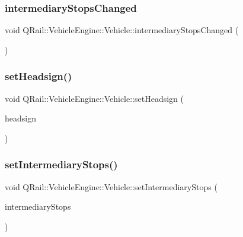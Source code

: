 \subsubsection{\texorpdfstring{intermediaryStopsChanged}{intermediaryStopsChanged}}
{\footnotesize\ttfamily void Q\+Rail\+::\+Vehicle\+Engine\+::\+Vehicle\+::intermediary\+Stops\+Changed (\begin{DoxyParamCaption}{ }\end{DoxyParamCaption})\hspace{0.3cm}{\ttfamily [signal]}}

\mbox{\label{classQRail_1_1VehicleEngine_1_1Vehicle_a699a7d8cd3a6a665554cff78d7ce1472}} 
\subsubsection{\texorpdfstring{setHeadsign()}{setHeadsign()}}
{\footnotesize\ttfamily void Q\+Rail\+::\+Vehicle\+Engine\+::\+Vehicle\+::set\+Headsign (\begin{DoxyParamCaption}\item[{const Q\+String \&}]{headsign }\end{DoxyParamCaption})}

\mbox{\label{classQRail_1_1VehicleEngine_1_1Vehicle_a814dd6b24d42e7cfe11dd5bd1b46456a}} 
\subsubsection{\texorpdfstring{setIntermediaryStops()}{setIntermediaryStops()}}
{\footnotesize\ttfamily void Q\+Rail\+::\+Vehicle\+Engine\+::\+Vehicle\+::set\+Intermediary\+Stops (\begin{DoxyParamCaption}\item[{const Q\+List$<$ \mbox{\hyperlink{classQRail_1_1VehicleEngine_1_1Stop}{Q\+Rail\+::\+Vehicle\+Engine\+::\+Stop}} $\ast$ $>$ \&}]{intermediary\+Stops }\end{DoxyParamCaption})}

